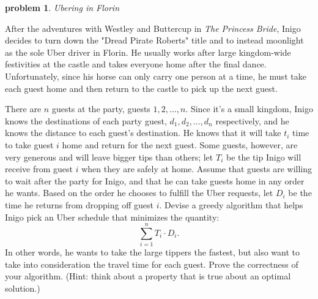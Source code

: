 \documentclass[10pt]{article}
\newtheorem{problem}{\sc\color{cit}problem}
\begin{document}
\begin{problem}Ubering in Florin\end{problem}
After the adventures with Westley and Buttercup in \emph{The Princess Bride}, Inigo decides to turn down the "Dread Pirate Roberts" title and to instead moonlight as the sole Uber driver in Florin.  He usually works after large kingdom-wide festivities at the castle and takes everyone home after the final dance.  Unfortunately, since his horse can only carry one person at a time, he must take each guest home and then return to the castle to pick up the next guest.

There are $n$ guests at the party, guests $1, 2, ..., n$.  Since it's a small kingdom, Inigo knows the destinations of each party guest, $d_1, d_2, ..., d_n$ respectively, and he knows the distance to each guest's destination.  He knows that it will take $t_i$ time to take guest $i$ home and return for the next guest.  Some guests, however, are very generous and will leave bigger tips than others; let $T_i$ be the tip Inigo will receive from guest $i$ when they are safely at home.  Assume that guests are willing to wait after the party for Inigo, and that he can take guests home in any order he wants.  Based on the order he chooses to fulfill the Uber requests, let $D_i$ be the time he returns from dropping off guest $i$.  Devise a greedy algorithm that helps Inigo pick an Uber schedule that minimizes the quantity:
\[ \sum_{i=1}^{n} T_i \cdot D_i.\]
In other words, he wants to take the large tippers the fastest, but also want to take into consideration the travel time for each guest.  Prove the correctness of your algorithm.  (Hint: think about a property that is true about an optimal solution.)
\end{document}
